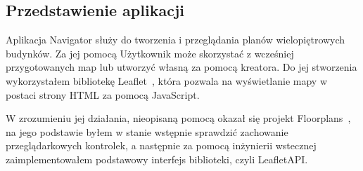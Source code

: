 \subsection{Przedstawienie aplikacji}

Aplikacja Navigator służy do tworzenia i przeglądania planów wielopiętrowych budynków.
Za jej pomocą Użytkownik może skorzystać z wcześniej przygotowanych map lub utworzyć własną za pomocą kreatora.
Do jej stworzenia wykorzystałem bibliotekę Leaflet~\cite{leafletGithub}, 
która pozwala na wyświetlanie mapy w postaci strony HTML za pomocą JavaScript.

W zrozumieniu jej działania, nieopisaną pomocą okazał się projekt Floorplans~\cite{floorplansGithub},
na jego podstawie byłem w stanie wstępnie sprawdzić zachowanie przeglądarkowych kontrolek, 
a następnie za pomocą inżynierii wstecznej zaimplementowałem podstawowy interfejs biblioteki, 
czyli LeafletAPI.